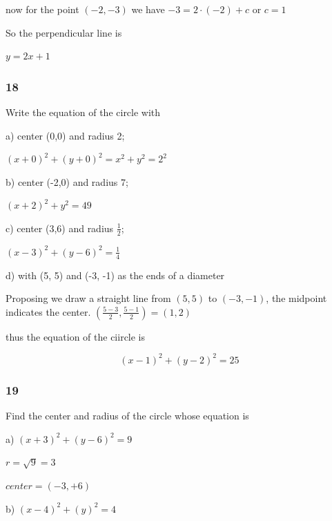\documentclass[]{report}
\begin{document}
now for the point $(-2, -3)$ we have $ -3 = 2 \cdot (-2) + c$ or $c = 1$

So the perpendicular line is

$y = 2x + 1$


\subsubsection{18}

Write the equation of the circle with

a) center (0,0) and radius 2;

$ (x + 0)^2 + (y+0)^2 = x^2 + y^2 = 2^2$


b) center (-2,0) and radius 7;

$(x+2)^2 +y^2 = 49$

c) center (3,6) and radius $\frac{1}{2}$;

$(x-3)^2 + (y-6)^2 = \frac{1}{4}$

d) with (5, 5) and (-3, -1) as the ends of a diameter

Proposing we draw a straight line from $(5, 5)$ to $(-3, -1)$, the midpoint indicates the center.
$(\frac{5-3}{2}, \frac{5-1}{2}) = (1, 2)$


thus the equation of the ciircle is 

\[
(x-1)^2 + (y-2)^2 = 25
\]

\subsubsection{19}

Find the center and radius of the circle whose equation is

a) $(x + 3)^2 + (y - 6) ^2 = 9$

$r = \sqrt{9} = 3$

$center = (-3, +6)$


b) $(x - 4)^2 + (y) ^2 = 4$
\end{document}
